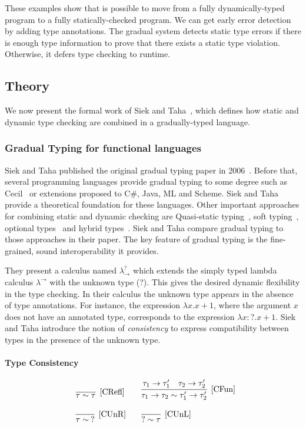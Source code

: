 \documentclass{article}
\newcommand\stlc[0]{$\lambda^{\rightarrow}$}
\newcommand\gstlc[0]{$\lambda^?_{\rightarrow}$}
\newcommand\rulename[1]{\mathrm{\text{[#1]}}}
\begin{document}
These examples show that is possible to move from a fully dynamically-typed program to a fully statically-checked program. We can get early error detection by adding type annotations. The gradual system detects static type errors if there is enough type information to prove that there exists a static type violation. Otherwise, it defers type checking to runtime. 
 
\subsection{Theory}
We now present the formal work of Siek and Taha~\cite{siekTaha:sfp2006}, which defines how static and dynamic type checking are combined in a gradually-typed language.

\subsubsection{Gradual Typing for functional languages}\label{ref:gtfl}
Siek and Taha published the original gradual typing paper in 2006~\cite{siekTaha:sfp2006}. Before that, several programming languages provide gradual typing to some degree such as Cecil~\cite{cecil-spec} or extensions proposed to C\#, Java, ML and Scheme. Siek and Taha provide a theoretical foundation for these languages. Other important approaches for combining static and dynamic checking are Quasi-static typing~\cite{thatte:popl1990}, soft typing~\cite{cartwrightFagan:pldi1991}, optional types~\cite{bracha:rdl2004} and hybrid types~\cite{knowlesFlanagan:toplas2010}. Siek and Taha compare gradual typing to those approaches in their paper. The key feature of gradual typing is the fine-grained, sound interoperability it provides.

They present a calculus named \gstlc \: which extends the simply typed lambda calculus \stlc \: with the unknown type (?). This gives the desired dynamic flexibility in the type checking. In their calculus the unknown type appears in the absence of type annotations. For instance, the expression $\lambda x. x+1$, where the argument $x$ does not have an annotated type, corresponds to the expression $\lambda x:?. x+1$. Siek and Taha introduce the notion of \textit{consistency} to express compatibility between types in the presence of the unknown type.
\paragraph{Type Consistency}\label{ref:type-consistency}
\[
\begin{tabular}{l l}
\infer[\rulename{CRefl}] 
{\tau \sim \tau}{} &
\infer[\rulename{CFun}] 
{\tau_1 \rightarrow \tau_2 \sim \tau'_1 \rightarrow \tau'_2}
{\tau_1 \rightarrow \tau'_1 \quad \tau_2 \rightarrow \tau'_2} \\
\\
\infer[\rulename{CUnR}] 
{\tau \sim  \: ?}{} &
\infer[\rulename{CUnL}] 
{ ? \sim \tau}{} 
\end{tabular}
\]
\end{document}
